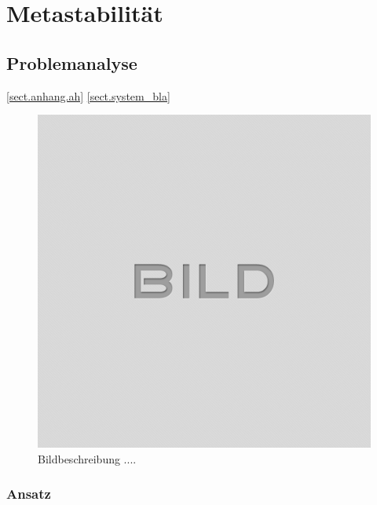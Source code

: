 
\chapter{Metastabilität}\label{chap.metastabilitat}

\section{Problemanalyse}\label{sect.meatastabil_bli}
\ref{sect.anhang.ah} 
\ref{sect.system_bla}

\begin{figure}[H]
	\centering
	\includegraphics[width=\textwidth]{images/idle.png}
	\caption{Bildbeschreibung ....}
	\label{fig.metastabil.bild8}
\end{figure}

\subsection{Ansatz}\label{sect.metastabil_blue}

